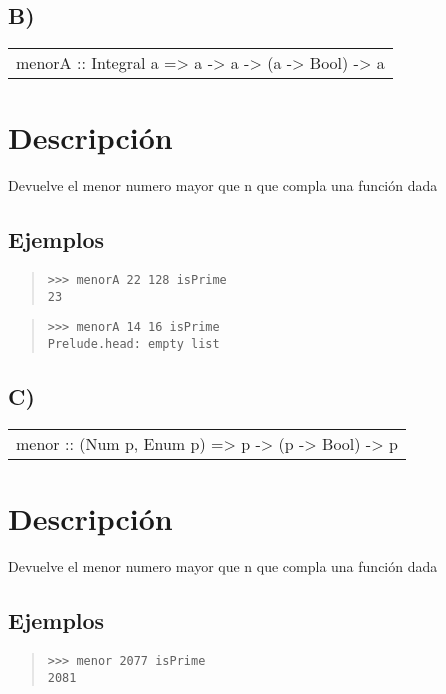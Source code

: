 \subsection{B)}
\begin{haddockdesc}
\item[\begin{tabular}{@{}l}
menorA :: Integral a => a -> a -> (a -> Bool) -> a
\end{tabular}]
{\haddockbegindoc
\section*{Descripción}
Devuelve el menor numero mayor que n que compla una función dada\par
\subsection*{Ejemplos}
\begin{quote}
{\haddockverb\begin{verbatim}
>>> menorA 22 128 isPrime
23

\end{verbatim}}
\end{quote}
\begin{quote}
{\haddockverb\begin{verbatim}
>>> menorA 14 16 isPrime
Prelude.head: empty list

\end{verbatim}}
\end{quote}}
\end{haddockdesc}
\subsection{C)}
\begin{haddockdesc}
\item[\begin{tabular}{@{}l}
menor :: (Num p, Enum p) => p -> (p -> Bool) -> p
\end{tabular}]
{\haddockbegindoc
\section*{Descripción}
Devuelve el menor numero mayor que n que compla una función dada\par
\subsection*{Ejemplos}
\begin{quote}
{\haddockverb\begin{verbatim}
>>> menor 2077 isPrime
2081

\end{verbatim}}
\end{quote}}
\end{haddockdesc}
